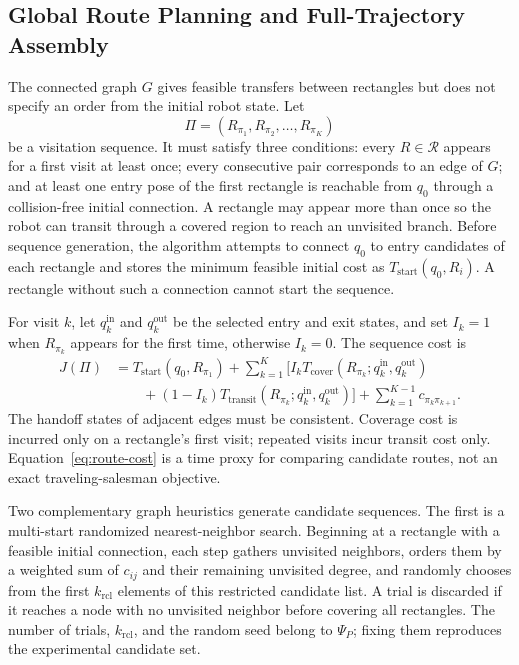 \documentclass[a4paper,11pt]{article}
\begin{document}
\subsection{Global Route Planning and Full-Trajectory Assembly}

The connected graph $G$ gives feasible transfers between rectangles but does not specify an order from the initial robot state. Let
\begin{equation}
\Pi=(R_{\pi_1},R_{\pi_2},\ldots,R_{\pi_K})
\tag{20}
\label{eq:visit-sequence}
\end{equation}
be a visitation sequence. It must satisfy three conditions: every $R\in\mathcal R$ appears for a first visit at least once; every consecutive pair corresponds to an edge of $G$; and at least one entry pose of the first rectangle is reachable from $q_0$ through a collision-free initial connection. A rectangle may appear more than once so the robot can transit through a covered region to reach an unvisited branch. Before sequence generation, the algorithm attempts to connect $q_0$ to entry candidates of each rectangle and stores the minimum feasible initial cost as $T_{\mathrm{start}}(q_0,R_i)$. A rectangle without such a connection cannot start the sequence.

For visit $k$, let $q_k^{\mathrm{in}}$ and $q_k^{\mathrm{out}}$ be the selected entry and exit states, and set $I_k=1$ when $R_{\pi_k}$ appears for the first time, otherwise $I_k=0$. The sequence cost is
\begin{equation}
\begin{aligned}
J(\Pi)&=T_{\mathrm{start}}(q_0,R_{\pi_1})
+\sum_{k=1}^{K}\bigl[I_kT_{\mathrm{cover}}(R_{\pi_k};q_k^{\mathrm{in}},q_k^{\mathrm{out}})\\
&\qquad +(1-I_k)T_{\mathrm{transit}}(R_{\pi_k};q_k^{\mathrm{in}},q_k^{\mathrm{out}})\bigr]
+\sum_{k=1}^{K-1}c_{\pi_k\pi_{k+1}}.
\end{aligned}
\tag{21}
\label{eq:route-cost}
\end{equation}
The handoff states of adjacent edges must be consistent. Coverage cost is incurred only on a rectangle's first visit; repeated visits incur transit cost only. Equation~\eqref{eq:route-cost} is a time proxy for comparing candidate routes, not an exact traveling-salesman objective.

Two complementary graph heuristics generate candidate sequences. The first is a multi-start randomized nearest-neighbor search. Beginning at a rectangle with a feasible initial connection, each step gathers unvisited neighbors, orders them by a weighted sum of $c_{ij}$ and their remaining unvisited degree, and randomly chooses from the first $k_{\mathrm{rcl}}$ elements of this restricted candidate list. A trial is discarded if it reaches a node with no unvisited neighbor before covering all rectangles. The number of trials, $k_{\mathrm{rcl}}$, and the random seed belong to $\Psi_P$; fixing them reproduces the experimental candidate set.
\end{document}
